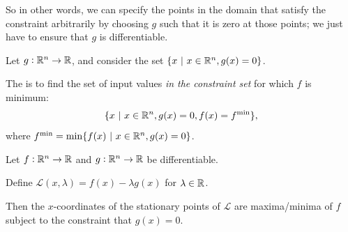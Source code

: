 So in other words, we can specify the points in the domain that satisfy the constraint arbitrarily
by choosing $g$ such that it is zero at those points; we just have to ensure that $g$ is differentiable.

Let $g:\mathbb{R}^n \to \mathbb{R}$, and consider the set $\{ x ~|~ x \in \mathbb{R}^n, g(x) = 0 \}$.

\begin{definition*}
  The  is to find the set of input values \emph{in the
constraint set} for which $f$ is minimum:
  \begin{align*}
    \{ x ~|~ x \in \mathbb{R}^n, g(x) = 0, f(x) = f^{\text{min}} \},
  \end{align*}
  where $f^{\text{min}} = \min \{f(x) ~|~ x \in \mathbb{R}^n, g(x) = 0\}$.
\end{definition*}


\begin{theorem*}
  Let $f: \mathbb{R}^n \to \mathbb{R}$ and $g:\mathbb{R}^n \to \mathbb{R}$ be differentiable.

  Define $\mathcal{L}(x, \lambda) = f(x) - \lambda g(x)$ for $\lambda \in \mathbb{R}$.

  Then the $x$-coordinates of the stationary points of $\mathcal{L}$ are maxima/minima of $f$ subject to
  the constraint that $g(x) = 0$.
\end{theorem*}

